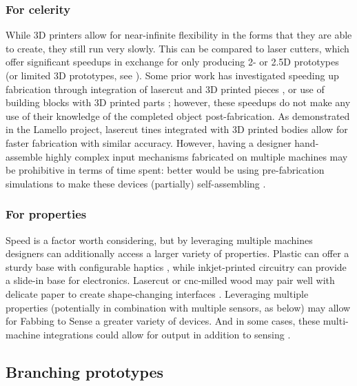     \subsubsection{For celerity}

    While 3D printers allow for near-infinite flexibility in the forms that they are able to create, they still run very slowly. This can be compared to laser cutters, which offer significant speedups in exchange for only producing 2- or 2.5D prototypes (or limited 3D prototypes, see \cite{mueller-laserorigami}). Some prior work has investigated speeding up fabrication through integration of lasercut and 3D printed pieces \cite{beyer-platener}, or use of building blocks with 3D printed parts \cite{mueller-fabrickation}; however, these speedups do not make any use of their knowledge of the completed object post-fabrication. As demonstrated in the Lamello project, lasercut tines integrated with 3D printed bodies allow for faster fabrication with similar accuracy. However, having a designer hand-assemble highly complex input mechanisms fabricated on multiple machines may be prohibitive in terms of time spent: better would be using pre-fabrication simulations to make these devices (partially) self-assembling \cite{tibbits-self-assembly}. 

    \subsubsection{For properties}
    
    Speed is a factor worth considering, but by leveraging multiple machines designers can additionally access a larger variety of properties. Plastic can offer a sturdy base with configurable haptics \cite{torres-hapticprint}, while inkjet-printed circuitry can provide a slide-in base for electronics. Lasercut or cnc-milled wood may pair well with delicate paper to create shape-changing interfaces \cite{yao-pneui}. Leveraging multiple properties (potentially in combination with multiple sensors, as below) may allow for Fabbing to Sense a greater variety of devices. And in some cases, these multi-machine integrations could allow for output in addition to sensing \cite{yao-pneui}.

\subsection{Branching prototypes}


